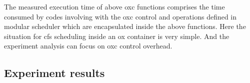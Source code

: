 The measured execution time of above oxc functions comprises the time 
consumed by codes involving with the oxc control and operations defined 
in modular scheduler which are encapsulated inside the above functions.
Here the situation for cfs scheduling inside an ox container is very simple.
And the experiment analysis can focus on oxc control overhead.

\subsection{Experiment results}





